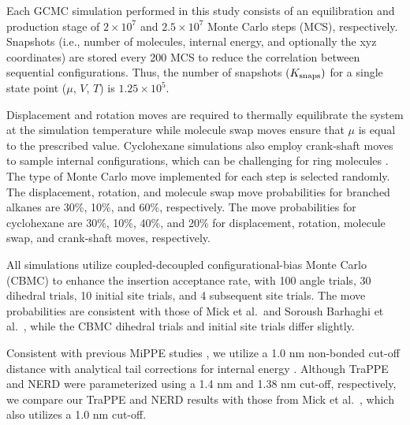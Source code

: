 \documentclass[journal=jced,manuscript=article]{achemso}
\begin{document}

Each GCMC simulation performed in this study consists of an equilibration and production stage of $2 \times 10^7$ and $2.5 \times 10^7$ Monte Carlo steps (MCS), respectively. Snapshots (i.e., number of molecules, internal energy, and optionally the xyz coordinates) are stored every 200 MCS to reduce the correlation between sequential configurations. Thus, the number of snapshots $(K_{\rm snaps})$ for a single state point ($\mu$, $V$, $T$) is $1.25 \times 10^5$.




Displacement and rotation moves are required to thermally equilibrate the system at the simulation temperature while molecule swap moves ensure that $\mu$ is equal to the prescribed value. Cyclohexane simulations also employ crank-shaft moves to sample internal configurations, which can be challenging for ring molecules \cite{Shah2011,Binder1979}. The type of Monte Carlo move implemented for each step is selected randomly. The displacement, rotation, and molecule swap move probabilities for branched alkanes are 30\%, 10\%, and 60\%, respectively. The move probabilities for cyclohexane are 30\%, 10\%, 40\%, and 20\% for displacement, rotation, molecule swap, and crank-shaft moves, respectively. 

All simulations utilize coupled-decoupled configurational-bias Monte Carlo (CBMC)\cite{Martin1999} to enhance the insertion acceptance rate, with 100 angle trials, 30 dihedral trials, 10 initial site trials, and 4 subsequent site trials. The move probabilities are consistent with those of Mick et al.~and Soroush Barhaghi et al.~\cite{Potoff_branched,Barhaghi2017}, while the CBMC dihedral trials and initial site trials differ slightly.

Consistent with previous MiPPE studies \cite{Mie,Potoff_branched,Barhaghi2017}, we utilize a 1.0 nm non-bonded cut-off distance with analytical tail corrections for internal energy \cite{Allen1987}. Although TraPPE \cite{TraPPE,Martin1999,Keasler2012} and NERD \cite{NERD,Nath2001} were parameterized using a 1.4 nm and 1.38 nm cut-off, respectively, we compare our TraPPE and NERD results with those from Mick et al.~\cite{Potoff_branched}, which also utilizes a 1.0 nm cut-off.
\end{document}
